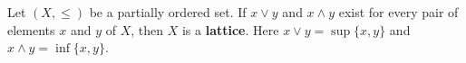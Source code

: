 Let $(X, \leq)$ be a partially ordered set. If $x \vee y$ and $x \wedge y$ exist for every pair of elements $x$ and $y$ of $X$, then $X$ is a \textbf{lattice}. Here $x \vee y = \sup\{x, y\}$ and $x \wedge y = \inf\{x, y\}$.
